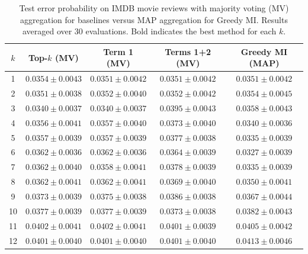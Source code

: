 \documentclass{article}
\theoremstyle{plain}
\theoremstyle{definition}
\theoremstyle{remark}
\begin{document}
\begin{table}[ht]
\centering
\caption{Test error probability on IMDB movie reviews with majority voting (MV) aggregation for baselines versus MAP aggregation for Greedy MI. Results averaged over 30 evaluations. Bold indicates the best method for each $k$.}
\label{tab:imdb_mv_vs_map}
\small
\begin{tabular}{ccccc}
\toprule
$k$ & Top-$k$ (MV) & Term 1 (MV) & Terms 1+2 (MV) & Greedy MI (MAP) \\
\midrule
1  & $0.0354 \pm 0.0043$ & $0.0351 \pm 0.0042$ & $0.0351 \pm 0.0042$ & $0.0351 \pm 0.0042$ \\
2  & $0.0351 \pm 0.0038$ & $0.0352 \pm 0.0040$ & $0.0352 \pm 0.0042$ & $0.0354 \pm 0.0045$ \\
3  & $\mathbf{0.0340 \pm 0.0037}$ & $\mathbf{0.0340 \pm 0.0037}$ & $0.0395 \pm 0.0043$ & $0.0358 \pm 0.0043$ \\
4  & $0.0356 \pm 0.0041$ & $0.0357 \pm 0.0040$ & $0.0373 \pm 0.0040$ & $\mathbf{0.0340 \pm 0.0036}$ \\
5  & $0.0357 \pm 0.0039$ & $0.0357 \pm 0.0039$ & $0.0377 \pm 0.0038$ & $\mathbf{0.0335 \pm 0.0039}$ \\
6  & $0.0362 \pm 0.0036$ & $0.0362 \pm 0.0036$ & $0.0364 \pm 0.0039$ & $\mathbf{0.0327 \pm 0.0039}$ \\
7  & $0.0362 \pm 0.0040$ & $0.0358 \pm 0.0041$ & $0.0378 \pm 0.0039$ & $\mathbf{0.0335 \pm 0.0039}$ \\
8  & $0.0362 \pm 0.0041$ & $0.0362 \pm 0.0041$ & $0.0369 \pm 0.0040$ & $\mathbf{0.0350 \pm 0.0041}$ \\
9  & $0.0373 \pm 0.0039$ & $0.0375 \pm 0.0038$ & $0.0386 \pm 0.0038$ & $\mathbf{0.0367 \pm 0.0044}$ \\
10 & $0.0377 \pm 0.0039$ & $0.0377 \pm 0.0039$ & $\mathbf{0.0373 \pm 0.0038}$ & $0.0382 \pm 0.0043$ \\
11 & $0.0402 \pm 0.0041$ & $0.0402 \pm 0.0041$ & $\mathbf{0.0401 \pm 0.0039}$ & $0.0405 \pm 0.0042$ \\
12 & $\mathbf{0.0401 \pm 0.0040}$ & $\mathbf{0.0401 \pm 0.0040}$ & $\mathbf{0.0401 \pm 0.0040}$ & $0.0413 \pm 0.0046$ \\
\bottomrule
\end{tabular}
\end{table}
\end{document}
